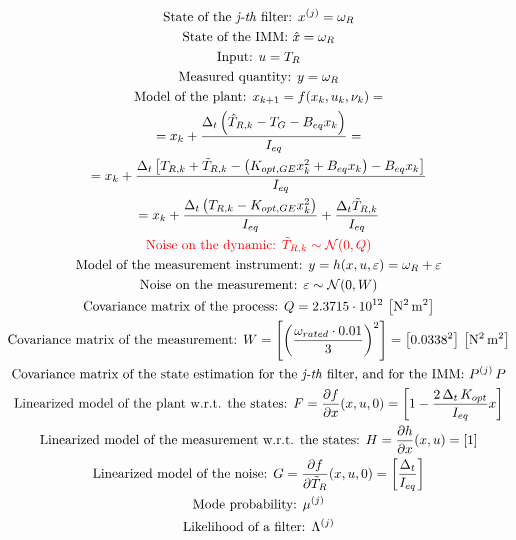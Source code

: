 \documentclass[11pt, a4paper]{article}
\begin{document}
\begin{multline}
  \text{State of the \textit{j-th} filter: } x^{(j)} = \omega_{R} \\
  \text{State of the IMM: } \hat{x} = \omega_R\\
  \text{Input: } u = T_{R}\\
  \text{Measured quantity: } y = \omega_{R} \\
  \text{Model of the plant: }  x_{k+1} = f(x_k, u_k, \nu_k) = \\ \notag
  = x_k + \frac{\Delta_t\left(\hat{T}_{R,k} - T_G - B_{eq}x_k\right)}{I_{eq}}=\\ \notag
  = x_k + \frac{\Delta_t\left[T_{R,k} + \tilde{T}_{R,k} - \left(K_{opt,GE}x_k^2 + B_{eq}x_k \right) - B_{eq}x_k\right]}{I_{eq}}\\ \notag
  = x_k + \frac{\Delta_t\left(T_{R,k}  - K_{opt,GE}x_k^2 \right)}{I_{eq}} + \frac{\Delta_t \tilde{T}_{R,k}}{I_{eq}}\\ 
  \textcolor{red}{\text{Noise on the dynamic: } \tilde{T}_{R,k} \sim \mathcal{N}(0, Q)} \\ \label{eq:noise_Q}
  \text{Model of the measurement instrument: } y = h(x, u, \varepsilon) = \omega_{R} + \varepsilon \\
  \text{Noise on the measurement: } \varepsilon \sim \mathcal{N}(0, W)  \\
  \text{Covariance matrix of the process: } Q = 2.3715\cdot10^{12} \, \left[\si{\square\newton\square \meter}\right]\\
  \text{Covariance matrix of the measurement: } W = \left[\left(\frac{\omega_{rated}\cdot 0.01}{3}\right)^2\right] = \left[0.0338^2\right] \, \left[\si{\square\newton\square \meter}\right]\\
  \text{Covariance matrix of the state estimation for the \textit{j-th} filter, and for the IMM: } P^{(j)} \, P\\
  \text{Linearized model of the plant w.r.t. the states: } F = \frac{\partial f}{\partial x}(x, u, 0) = \left[1-\frac{2\,\Delta_t\,K_{opt}}{I_{eq}}x\right]\\
  \text{Linearized model of the measurement w.r.t. the states: } H = \frac{\partial h}{\partial x}(x, u) = \left[1\right]\\
  \text{Linearized model of the noise: } G = \frac{\partial f}{\partial \tilde{T}_R}(x, u, 0)=\left[\frac{\Delta_t}{I_{eq}}\right]\\
  \text{Mode probability: } \mu^{(j)}\\
  \text{Likelihood of a filter: } \Lambda^{(j)}
\end{multline}
\end{document}
